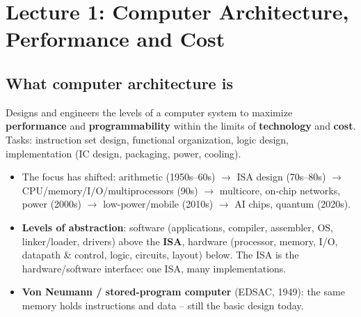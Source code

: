 \documentclass[11pt]{article}
\begin{document}
\sloppy
{}

\section{Lecture 1: Computer Architecture, Performance and Cost}

\subsection{What computer architecture is}
\begin{definition}
Designs and engineers the levels of a computer system to maximize
\textbf{performance} and \textbf{programmability} within the limits of
\textbf{technology} and \textbf{cost}. Tasks: instruction set design,
functional organization, logic design, implementation (IC design, packaging,
power, cooling).
\end{definition}
\begin{itemize}[leftmargin=*]
  \item The focus has shifted: arithmetic (1950s--60s) $\to$ ISA design
  (70s--80s) $\to$ CPU/memory/I/O/multiprocessors (90s) $\to$ multicore,
  on-chip networks, power (2000s) $\to$ low-power/mobile (2010s) $\to$ AI chips,
  quantum (2020s).
  \item \textbf{Levels of abstraction}: software (applications, compiler,
  assembler, OS, linker/loader, drivers) above the \textbf{ISA}, hardware
  (processor, memory, I/O, datapath \& control, logic, circuits, layout)
  below. The ISA is the hardware/software interface: one ISA, many
  implementations.
  \item \textbf{Von Neumann / stored-program computer} (EDSAC, 1949): the
  same memory holds instructions and data -- still the basic design today.
\end{itemize}
\end{document}
